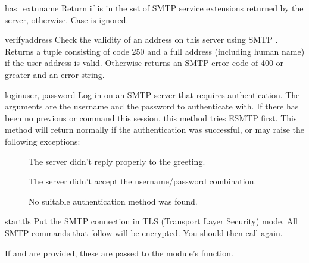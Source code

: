 \begin{methoddesc}{has_extn}{name}
Return  if  is in the set of SMTP service extensions
returned by the server,  otherwise.  Case is ignored.
\end{methoddesc}

\begin{methoddesc}{verify}{address}
Check the validity of an address on this server using SMTP .
Returns a tuple consisting of code 250 and a full  address
(including human name) if the user address is valid. Otherwise returns
an SMTP error code of 400 or greater and an error string.

\end{methoddesc}

\begin{methoddesc}{login}{user, password}
Log in on an SMTP server that requires authentication.
The arguments are the username and the password to authenticate with.
If there has been no previous  or  command this
session, this method tries ESMTP  first.
This method will return normally if the authentication was successful,
or may raise the following exceptions:

\begin{description}
  \item[]
    The server didn't reply properly to the  greeting.
  \item[]
    The server didn't accept the username/password combination.
  \item[]
    No suitable authentication method was found.
\end{description}
\end{methoddesc}

\begin{methoddesc}{starttls}{}
Put the SMTP connection in TLS (Transport Layer Security) mode.  All
SMTP commands that follow will be encrypted.  You should then call
 again.

If  and  are provided, these are passed to
the  module's  function.
\end{methoddesc}

